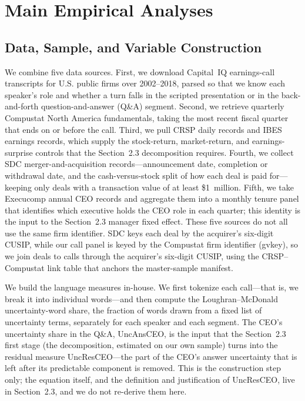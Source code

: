 \chapter{Main Empirical Analyses}\label{ch:main}

\section{Data, Sample, and Variable Construction}

We combine five data sources. First, we download Capital~IQ earnings-call transcripts for U.S. public firms over 2002--2018, parsed so that we know each speaker's role and whether a turn falls in the scripted presentation or in the back-and-forth question-and-answer (Q\&A) segment. Second, we retrieve quarterly Compustat North America fundamentals, taking the most recent fiscal quarter that ends on or before the call. Third, we pull CRSP daily records and IBES earnings records, which supply the stock-return, market-return, and earnings-surprise controls that the Section~2.3 decomposition requires. Fourth, we collect SDC merger-and-acquisition records---announcement date, completion or withdrawal date, and the cash-versus-stock split of how each deal is paid for---keeping only deals with a transaction value of at least \$1~million. Fifth, we take Execucomp annual CEO records and aggregate them into a monthly tenure panel that identifies which executive holds the CEO role in each quarter; this identity is the input to the Section~2.3 manager fixed effect. These five sources do not all use the same firm identifier. SDC keys each deal by the acquirer's six-digit CUSIP, while our call panel is keyed by the Compustat firm identifier (gvkey), so we join deals to calls through the acquirer's six-digit CUSIP, using the CRSP--Compustat link table that anchors the master-sample manifest.

We build the language measures in-house. We first tokenize each call---that is, we break it into individual words---and then compute the Loughran--McDonald uncertainty-word share, the fraction of words drawn from a fixed list of uncertainty terms, separately for each speaker and each segment. The CEO's uncertainty share in the Q\&A, UncAnsCEO, is the input that the Section~2.3 first stage (the \citet{dwz} decomposition, estimated on our own sample) turns into the residual measure UncResCEO---the part of the CEO's answer uncertainty that is left after its predictable component is removed. This is the construction step only; the equation itself, and the definition and justification of UncResCEO, live in Section~2.3, and we do not re-derive them here.

